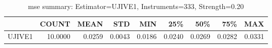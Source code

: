 \begin{table}[ht]
\centering
\caption{mse summary: Estimator=UJIVE1, Instruments=333, Strength=0.20}
\begin{tabular}{lrrrrrrrr}
\toprule
 & COUNT & MEAN & STD & MIN & 25\% & 50\% & 75\% & MAX \\
\midrule
UJIVE1 & 10.0000 & 0.0259 & 0.0043 & 0.0186 & 0.0240 & 0.0269 & 0.0282 & 0.0331 \\
\bottomrule
\end{tabular}
\end{table}
